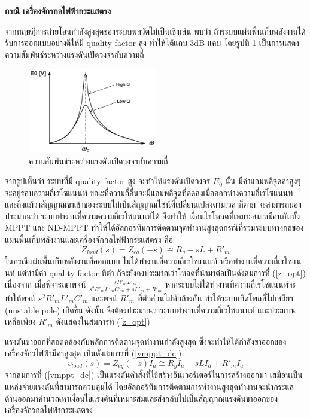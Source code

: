 \documentclass[11pt,a4paper]{article}
\begin{document}
\textbf{กรณี เครื่องจักรกลไฟฟ้ากระแสตรง}

จากทฤษฎีการถ่ายโอนกำลังสูงสุดของระบบพลวัตไม่เป็นเชิงเส้น พบว่า ถ้าระบบแผ่นพื้นเก็บพลังงานได้รับการออกแบบอย่างดีให้มี quality factor สูง ทำให้ได้แถบ 3dB แคบ โดยรูปที่ \ref{Q_factor} เป็นการแสดงความสัมพันธ์ระหว่างแรงดันเปิดวงจรกับความถี่
\begin{figure}[H]
    \begin{center}
        \includegraphics[width=0.5\textwidth]{Q_factor.jpeg.jpg}
    \end{center}
    \caption{ความสัมพันธ์ระหว่างแรงดันเปิดวงจรกับความถี่ }
    \label{Q_factor}
\end{figure}
จากรูปเห็นว่า ระบบที่มี quality factor สูง จะทำให้แรงดันเปิดวงจร $E_{0}$ นั้น มีค่าแอมพลิจูดค่าสูงๆจะอยู่รอบความถี่เรโซแนนท์ ขณะที่ความถี่อื่นจะมีแอมพลิจูดที่ลดลงเมื่อออกห่างความถี่เรโซแนนท์ และถึงแม้ว่าสัญญาณขาเข้าของระบบไม่เป็นสัญญาณไซน์ที่เปลี่ยนแปลงตามเวลาก็ตาม จะสามารถมองประมาณว่า ระบบทำงานที่ความความถี่เรโซแนนท์ได้
จึงทำให้ เงื่อนไขโหลดที่เหมาะสมเหมือนกันทั้ง MPPT และ ND-MPPT ทำให้ได้อัลกอริทึมการติดตามจุดทำงานสูงสุดกรณีที่รวมระบบทางกลของแผ่นพื้นเก็บพลังงานและเครื่องจักกลไฟฟ้ากระแสตรง คือ
ิ\begin{equation} \label{z_opt}
    Z_{load}(s)= Z_{eq} (-s) \cong R_{g} - sL+ R'_{m}
\end{equation}
ในกรณีแผ่นพื้นเก็บพลังงานที่ออกแบบ ไม่ได้ทำงานที่ความถี่เรโซแนนท์ หรือทำงานที่ความถี่เรโซแนนท์ แต่ทำมีค่า quality factor ที่ต่ำ ก็จะยังคงประมาณว่าโหลดที่นำมาต่อเป็นดังสมการที่ (\ref{z_opt})
เนื่องจาก เมื่อพิจารณาพจน์ $\frac{ sR'_{m}L'_{m} }{ s^2R'_{m}L'_{m}C'_{m} + sL'_{m} + R'_{m}}$ หากระบบไม่ได้ทำงานที่ความถี่เรโซแนนท์จะทำให้พจน์ $s^2R'_{m}L'_{m}C'_{m}$ และพจน์ $R'_{m}$ ที่ตัวส่วนไม่หักล้างกัน
ทำให้ระบบเกิดโพลที่ไม่เสถียร (unstable pole) เกิดขึ้น ดังนั้น จึงต้องประมาณว่าระบบทำงานที่ความถี่เรโซแนนท์ และประมาณเหลือเพียง $R'_{m}$ ดังแสดงในสมการที่ (\ref{z_opt})

แรงดันขาออกที่สอดคล้องกับหลักการติดตามจุดทำงานกำลังสูงสุด ซึ่งจะทำให้ได้กำลังขาออกของเครื่องจักรไฟฟ้ามีค่าสูงสุด เป็นดังสมการที่ (\ref{vmppt_dc})
\begin{equation}\label{vmppt_dc}
    v_{load}(s)= Z_{eq}(-s)I_{a} \cong R_{g}I_{a} - sLI_{a} + R'_{m}I_{a}
\end{equation}
จากสมการที่ (\ref{vmppt_dc}) เป็นแรงดันคำสั่งที่ใช้สร้างอินเวอร์เตอร์ในการสร้างออกมา เสมือนเป็นแหล่งจ่ายแรงดันที่สามารถควบคุมได้ โดยอัลกอริทึมการติดตามการทำงานสูงสุดทำงานจะนำกระแสด้านออกมาคำนวณหาเงื่อนไขแรงดันที่เหมาะสมและส่งกลับไปเป็นสัญญาณแรงดันขาออกของเครื่องจักรกลไฟฟ้ากระแสตรง
\end{document}
